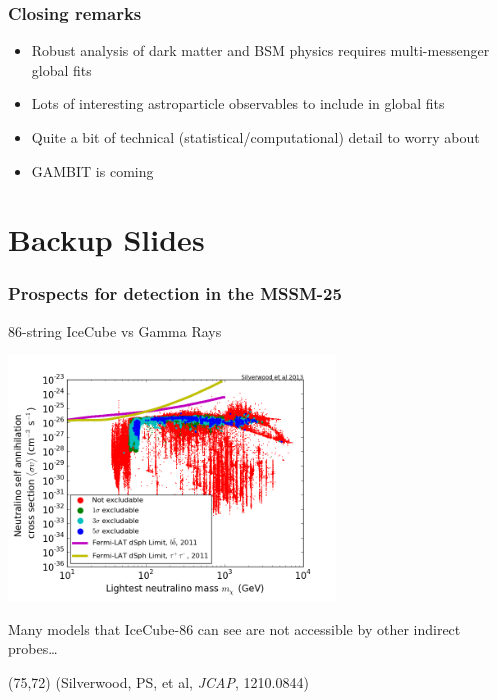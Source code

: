 \documentclass[xcolor=dvipsnames]{beamer}
\begin{document}
\begin{frame}
\frametitle{Closing remarks}

\begin{itemize}
\item{Robust analysis of dark matter and BSM physics requires multi-messenger global fits}
\item{Lots of interesting astroparticle observables to include in global fits}
\item{Quite a bit of technical (statistical/computational) detail to worry about}
\item{GAMBIT is coming}
\end{itemize}


\end{frame}

\appendix

\section{Backup Slides}

\begin{frame}
\frametitle{Prospects for detection in the MSSM-25}
86-string IceCube vs Gamma Rays

\begin{center}
\includegraphics[width=0.65\textwidth]{MSSM25_ID}
\end{center}

Many models that IceCube-86 can see are not accessible by other indirect probes\ldots

\begin{textblock}{80}(75,72)
  {\tiny(Silverwood, PS, et al, \textit{JCAP}, 1210.0844)}
\end{textblock}

\end{frame}
\end{document}
